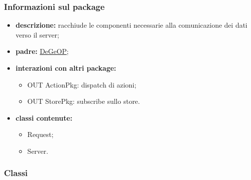 \subsubsection{Informazioni sul package}
\begin{itemize}
	\item \textbf{descrizione:} racchiude le componenti necessarie alla comunicazione dei dati verso il server;
	\item \textbf{padre:} \hyperref[pkg::DeGeOP]{DeGeOP};
	\item \textbf{interazioni con altri package:} 
	\begin{itemize}
		\item OUT ActionPkg: dispatch di azioni;
		\item OUT StorePkg: subscribe sullo store.
	\end{itemize}
	\item \textbf{classi contenute:}
	\begin{itemize}
		\item Request;
		\item Server.
	\end{itemize}
\end{itemize}
\subsubsection{Classi}
